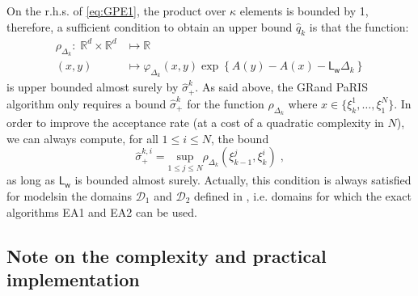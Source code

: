 \documentclass[12pt,draft]{article}
\newcommand{\eqsp}{\;}
\newcommand{\1}{\mathrm{1}}
\newcommand{\mw}{\mathsf{w}}%
\newcommand{\Lo}{\mathsf{L}}
\begin{document}
On the r.h.s. of \eqref{eq:GPE1}, the product over $\kappa$ elements is bounded by 1, therefore, a sufficient condition to obtain an upper bound  $\hat{q}_k$ is that the function:
\begin{align*}
\rho_{\Delta_k}:\eqsp\mathbb{R}^d\times \mathbb{R}^d &\mapsto \mathbb{R}\\
(x,y)&\mapsto \varphi_{\Delta_k}(x,y) \exp \left\{A(y) - A(x)- \Lo_\mw\Delta_k \right\}
\end{align*}
is upper bounded almost surely by $\hat{\sigma}_+^k$.
As said above, the GRand PaRIS algorithm only requires a bound $\hat{\sigma}_+^k$ for the function $\rho_{\Delta_k}$ where $x \in \{\xi_{k}^1,\dots,\xi_{1}^N\}$. In order to improve the acceptance rate (at a cost of a quadratic complexity in $N$), we can always compute, for all $1\le i\le N$, the bound 
\begin{equation}
\hat{\sigma}_{+}^{k,i}= \underset{1 \le j\le N}{\text{sup}}\rho_{\Delta_k}(\xi_{k-1}^j,\xi_k^i)\eqsp, \label{eq:quadr:bound}
\end{equation}
as long as $\Lo_\mw$ is bounded almost surely. Actually, this condition is always satisfied for modelsin the domains $\mathcal{D}_1$ and $\mathcal{D}_2$ defined in \cite{beskos:papaspiliopoulos:roberts:fearnhead:2006}, i.e. domains for which the exact algorithms EA1 and EA2 can be used.
\subsection*{Note on the complexity and practical implementation}
\end{document}
